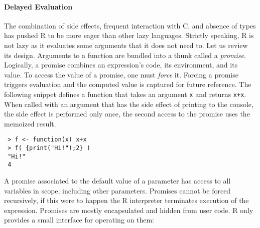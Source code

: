 \documentclass[review,creen,acmsmall]{acmart}
\renewcommand{\c}[1]{\lstinline |#1|\xspace}
\begin{document}
\paragraph{Delayed Evaluation}
The combination of side effects, frequent interaction with C, and absence of
types has pushed R to be more eager than other lazy languages. Strictly
speaking, R is not lazy as it evaluates some arguments that it does not need to.
Let us review its design. Arguments to a function are bundled into a thunk
called a \emph{promise}. Logically, a promise combines an expression's code, its
environment, and its value. To access the value of a promise, one must
\emph{force} it. Forcing a promise triggers evaluation and the computed value is
captured for future reference. The following snippet defines a function that
takes an argument \c x and returns \c{x+x}. When called with an argument
that has the side effect of printing to the console, the side effect is
performed only once, the second access to the promise uses the memoized result.

\begin{lstlisting}
 > f <- function(x) x+x
 > f( {print("Hi!");2} )
 "Hi!"
 4
\end{lstlisting}


A promise associated to the default value of a parameter has access to all
variables in scope, including other parameters. Promises cannot be forced
recursively, if this were to happen the R interpreter terminates execution of
the expression. Promises are mostly encapsulated and hidden from user code. R
only provides a small interface for operating on them:
\end{document}
